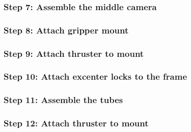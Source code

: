 

\subsubsection{Step 7: Assemble the middle camera}





\subsubsection{Step 8: Attach gripper mount}




\subsubsection{Step 9: Attach thruster to mount}




\subsubsection{Step 10: Attach excenter locks to the frame}




\subsubsection{Step 11: Assemble the tubes}





\subsubsection{Step 12: Attach thruster to mount}


